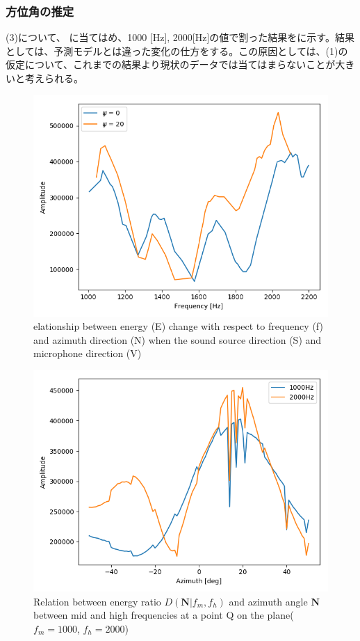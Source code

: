 \subsubsection{方位角の推定}
(3)について、 に当てはめ、1000 [Hz], 2000[Hz]の値で割った結果をに示す。結果としては、予測モデルとは違った変化の仕方をする。この原因としては、(1)の仮定について、これまでの結果より現状のデータでは当てはまらないことが大きいと考えられる。

\begin{figure}[ht]
  \begin{center}
  \vspace{1zh}
    \includegraphics[width=0.5\linewidth]{images/3_amp_fre_heimen.png}   
  \end{center}
  \vspace{-2zh}
  \caption{elationship between energy (E) change with respect to frequency (f) and azimuth direction (N) when the sound source direction (S) and microphone direction (V)}
  \label{fig:result1}
\end{figure}

\begin{figure}[ht]
  \begin{center}
  \vspace{1zh}
    \includegraphics[width=0.5\linewidth]{images/3_amp_azi_heimen.png}   
  \end{center}
  \caption{Relation between energy ratio $D(\mathbf{N}|f_m, f_h)$ and azimuth angle $\mathbf{N}$ between mid and high frequencies at a point Q on the plane($f_m = 1000$, $f_h = 2000$)}
  \label{fig:result2}
\end{figure}

